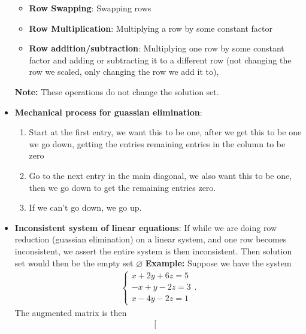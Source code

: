 \documentclass{report}
\begin{document}
\begin{itemize}
                \begin{itemize}
                    \item \textbf{Row Swapping}: Swapping rows
                    \item \textbf{Row Multiplication}: Multiplying a row by some constant factor
                    \item \textbf{Row addition/subtraction}: Multiplying one row by some constant factor and adding or subtracting it to a different row (not changing the row we scaled, only changing the row we add it to),
                \end{itemize}
                \bigbreak \noindent 
                \textbf{Note:} These operations do not change the solution set.
            \item \textbf{Mechanical process for guassian elimination}:
                \begin{enumerate}
                    \item Start at the first entry, we want this to be one, after we get this to be one we go down, getting the entries remaining entries in the column to be zero
                    \item Go to the next entry in the main diagonal, we also want this to be one, then we go down to get the remaining entries zero.
                    \item If we can't go down, we go up. 
                \end{enumerate}
            \item \textbf{Inconsistent system of linear equations}: If while we are doing row reduction (guassian elimination) on a linear system, and one row becomes inconsistent, we assert the entire system is then inconsistent. Then solution set would then be the empty set $\varnothing$
                \bigbreak \noindent 
                \textbf{Example:} Suppose we have the system
                \begin{align*}
                    \begin{cases}
                        x + 2y + 6z =5 \\
                        -x + y -2z =3  \\
                        x -4y -2z = 1
                    \end{cases}
                .\end{align*}
                The augmented matrix is then
                \begin{align*}
                    \left[
                        \begin{array}{ccc|c}

\end{array}
\end{align*}
\end{itemize}
\end{document}
